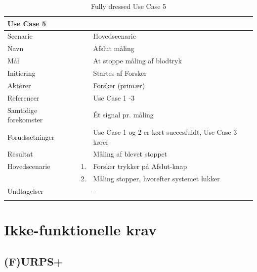 \begin{longtabu} to  %
	{\large \textbf{Use Case 5}} && \\
	\toprule
	Scenarie && Hovedscenarie\\
	Navn && Afslut måling \\
	Mål && At stoppe måling af blodtryk\\
	Initiering && Startes af Forsker\\
	Aktører && Forsker (primær)\\
	Referencer && Use Case 1 -3  \\
	Samtidige forekomster  &&  Ét signal pr. måling\\
	Forudsætninger && Use Case 1 og 2 er kørt succesfuldt, Use Case 3 kører\\
	Resultat && Måling af blevet stoppet\\ \midrule
	Hovedscenarie &    1. &		Forsker trykker på Afslut-knap\\[-1ex] 
	&    2. &   Måling stopper, hvorefter systemet lukker \\ \midrule	 	
	Undtagelser &    & - 	\\ \bottomrule
	\caption{Fully dressed Use Case 5}
	\label{UC5}
\end{longtabu}

\section{Ikke-funktionelle krav}


\subsection{(F)URPS+}

